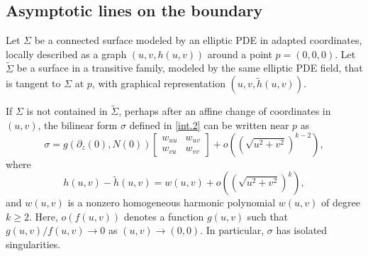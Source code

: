 \documentclass[11pt,reqno]{amsart}
\begin{document}


\subsection{Asymptotic lines on the boundary}

Let $\Sigma$ be a connected surface modeled by an elliptic PDE in adapted coordinates, locally described as a graph $(u, v, h(u, v))$ around a point $p=(0,0,0)$. Let $\widetilde{\Sigma}$ be a surface in a transitive family, modeled by the same elliptic PDE field, that is tangent to $\Sigma$ at $p$, with graphical representation $(u,v,\widetilde{h}(u,v))$. 

If $\Sigma$ is not contained in $\widetilde{\Sigma}$, perhaps after an affine change of coordinates in $(u,v)$, the bilinear form $\sigma$ defined in \eqref{int.2} can be written near $p$ as
\begin{equation}\label{formula sigma}
\sigma=g(\partial_z(0),N(0)) \begin{bmatrix}
    w_{uu} & w_{uv} \\ w_{vu} & w_{vv}
\end{bmatrix}+o((\sqrt{u^2+v^2})^{k-2}),
\end{equation}
where 
\begin{equation*}
    h(u,v)-\widetilde{h}(u,v)=w(u,v)+o((\sqrt{u^2+v^2})^{k}),
\end{equation*} 
and $w(u,v)$ is a nonzero homogeneous harmonic polynomial $w(u,v)$ of degree $k\geq 2$. Here, $o(f(u,v))$ denotes a function $g(u,v)$ such that $g(u,v)/f(u,v)\rightarrow 0$ as $(u,v)\rightarrow (0,0)$. In particular, $\sigma$ has isolated singularities.
\end{document}
